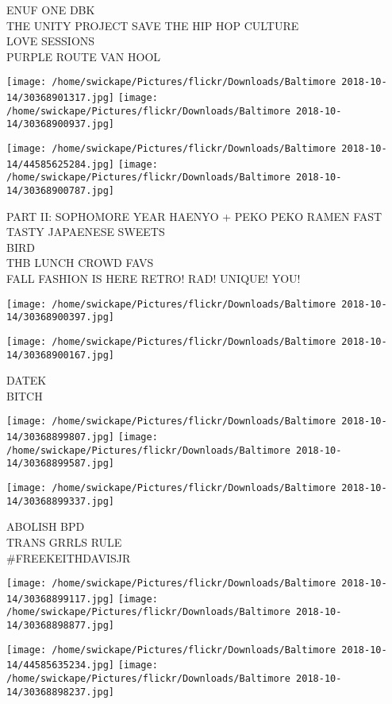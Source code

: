 \documentclass[10pt,letterpaper]{article}
\begin{document}
ENUF ONE DBK\\
THE UNITY PROJECT SAVE THE HIP HOP CULTURE\\
LOVE SESSIONS\\
PURPLE ROUTE VAN HOOL
\pagebreak

\texttt{[image: /home/swickape/Pictures/flickr/Downloads/Baltimore 2018-10-14/30368901317.jpg]}
\texttt{[image: /home/swickape/Pictures/flickr/Downloads/Baltimore 2018-10-14/30368900937.jpg]}

\texttt{[image: /home/swickape/Pictures/flickr/Downloads/Baltimore 2018-10-14/44585625284.jpg]}
\texttt{[image: /home/swickape/Pictures/flickr/Downloads/Baltimore 2018-10-14/30368900787.jpg]}

PART II: SOPHOMORE YEAR HAENYO + PEKO PEKO RAMEN FAST TASTY JAPAENESE SWEETS\\
BIRD\\
THB LUNCH CROWD FAVS\\
FALL FASHION IS HERE RETRO! RAD! UNIQUE! YOU!
\pagebreak

\texttt{[image: /home/swickape/Pictures/flickr/Downloads/Baltimore 2018-10-14/30368900397.jpg]}

\vspace{0.25in}
\texttt{[image: /home/swickape/Pictures/flickr/Downloads/Baltimore 2018-10-14/30368900167.jpg]}

DATEK\\
BITCH
\pagebreak

\texttt{[image: /home/swickape/Pictures/flickr/Downloads/Baltimore 2018-10-14/30368899807.jpg]}
\texttt{[image: /home/swickape/Pictures/flickr/Downloads/Baltimore 2018-10-14/30368899587.jpg]}

\vspace{0.25in}
\texttt{[image: /home/swickape/Pictures/flickr/Downloads/Baltimore 2018-10-14/30368899337.jpg]}

ABOLISH BPD\\
TRANS GRRLS RULE\\
\#FREEKEITHDAVISJR
\pagebreak

\texttt{[image: /home/swickape/Pictures/flickr/Downloads/Baltimore 2018-10-14/30368899117.jpg]}
\texttt{[image: /home/swickape/Pictures/flickr/Downloads/Baltimore 2018-10-14/30368898877.jpg]}

\texttt{[image: /home/swickape/Pictures/flickr/Downloads/Baltimore 2018-10-14/44585635234.jpg]}
\texttt{[image: /home/swickape/Pictures/flickr/Downloads/Baltimore 2018-10-14/30368898237.jpg]}
\end{document}
